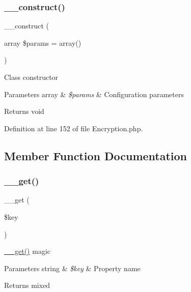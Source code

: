 \subsubsection{\texorpdfstring{\_\_construct()}{\_\_construct()}}
{\footnotesize\ttfamily \+\_\+\+\_\+construct (\begin{DoxyParamCaption}\item[{array}]{\$params = {\ttfamily array()} }\end{DoxyParamCaption})}

Class constructor


\begin{DoxyParams}[1]{Parameters}
array & {\em \$params} & Configuration parameters \\
\hline
\end{DoxyParams}
\begin{DoxyReturn}{Returns}
void 
\end{DoxyReturn}


Definition at line 152 of file Encryption.\+php.



\subsection{Member Function Documentation}
\mbox{\label{class_c_i___encryption_a4537dad3b44254124991341cc91b28fb}} 
\subsubsection{\texorpdfstring{\_\_get()}{\_\_get()}}
{\footnotesize\ttfamily \+\_\+\+\_\+get (\begin{DoxyParamCaption}\item[{}]{\$key }\end{DoxyParamCaption})}

\mbox{\hyperlink{class_c_i___encryption_a4537dad3b44254124991341cc91b28fb}{\+\_\+\+\_\+get()}} magic


\begin{DoxyParams}[1]{Parameters}
string & {\em \$key} & Property name \\
\hline
\end{DoxyParams}
\begin{DoxyReturn}{Returns}
mixed 
\end{DoxyReturn}


